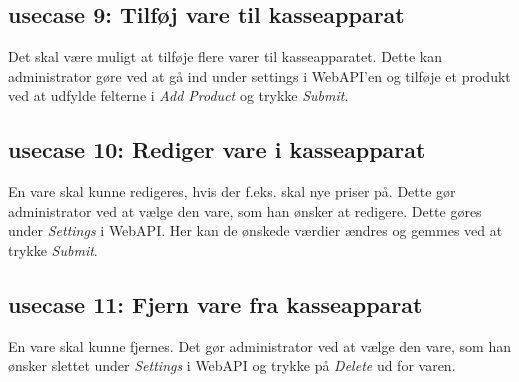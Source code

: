 \subsection*{\gls{usecase} 9: Tilføj vare til kasseapparat}
Det skal være muligt at tilføje flere varer til kasseapparatet. Dette kan \gls{administrator} gøre ved at gå ind under settings i \gls{WebAPI}'en og tilføje et produkt ved at udfylde felterne i \textit{Add Product} og trykke \textit{Submit}.

\subsection*{\gls{usecase} 10: Rediger vare i kasseapparat}
En vare skal kunne redigeres, hvis der f.eks. skal nye priser på. Dette gør \gls{administrator} ved at vælge den vare, som han ønsker at redigere. Dette gøres under \textit{Settings} i \gls{WebAPI}. Her kan de ønskede værdier ændres og gemmes ved at trykke \textit{Submit}.

\subsection*{\gls{usecase} 11: Fjern vare fra kasseapparat}
En vare skal kunne fjernes. Det gør \gls{administrator} ved at vælge den vare, som han ønsker slettet under \textit{Settings} i \gls{WebAPI} og trykke på \textit{Delete} ud for varen.